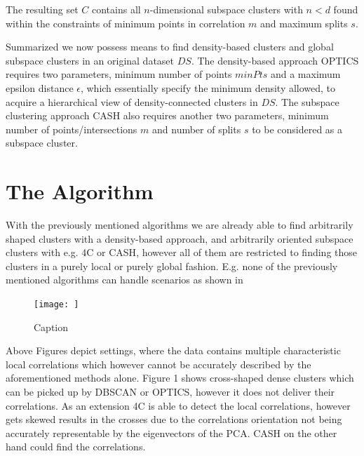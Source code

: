 The resulting set $C$ contains all $n$-dimensional subspace clusters with $n < d$ found within the constraints of minimum points in correlation $m$ and maximum splits $s$.

Summarized we now possess means to find density-based clusters and global subspace clusters in an original dataset $DS$. The density-based approach \ac{OPTICS} requires two parameters, minimum number of points $minPts$ and a maximum epsilon distance $\epsilon$, which essentially specify the minimum density allowed, to acquire a hierarchical view of density-connected clusters in $DS$. The subspace clustering approach \ac{CASH} also requires another two parameters, minimum number of points/intersections $m$ and number of splits $s$ to be considered as a subspace cluster.

\section{The Algorithm}
With the previously mentioned algorithms we are already able to find arbitrarily shaped clusters with a density-based approach, and arbitrarily oriented subspace clusters with e.g. \ac{4C} or \ac{CASH}, however all of them are restricted to finding those clusters in a purely local or purely global fashion. E.g. none of the previously mentioned algorithms can handle scenarios as shown in 
\begin{figure}
    \centering
    \texttt{[image: ]}
    \caption{Caption}
    \label{fig:}
\end{figure}
Above Figures  depict settings, where the data contains multiple characteristic local correlations which however cannot be accurately described by the aforementioned methods alone. Figure 1 shows cross-shaped dense clusters which can be picked up by \ac{DBSCAN} or \ac{OPTICS}, however it does not deliver their correlations. As an extension \ac{4C} is able to detect the local correlations, however gets skewed results in the crosses due to the correlations orientation not being accurately representable by the eigenvectors of the \ac{PCA}\cite{PCAshlens2014tutorial}. 
\ac{CASH} on the other hand could find the correlations. 

